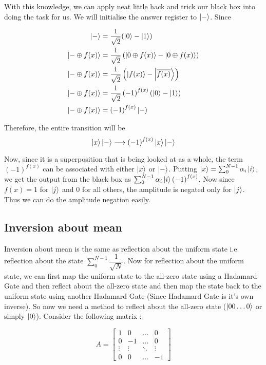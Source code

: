 \documentclass[a4paper]{article}
\begin{document}
With this knowledge, we can apply neat little hack and trick our black box into doing the task for us. We will initialise the answer register to $\ket{-}$. Since

\begin{align*}
\ket{-} &= \dfrac{1}{\sqrt{2}} ( \ket{0} - \ket{1} )\\
\ket{- \oplus {f(x)}} &= \dfrac{1}{\sqrt{2}} \left( \ket{0 \oplus {f(x)}} - \ket{0 \oplus {f(x)}} \right)\\
\ket{- \oplus {f(x)}} &= \dfrac{1}{\sqrt{2}} \left( \ket{{f(x)}} - \ket{\overline{f(x)}} \right)\\
\ket{- \oplus {f(x)}} &= \dfrac{1}{\sqrt{2}} \left( -1 \right) ^ {f(x)} \left( \ket{0} - \ket{1} \right)\\
\ket{- \oplus {f(x)}} &= \left( -1 \right) ^ {f(x)} \ket{-}\\
\end{align*}

Therefore, the entire transition will be
$$\ket{x}\ket{-} \longrightarrow \left( -1 \right) ^ {f(x)} \ket{x} \ket{-}$$

Now, since it is a superposition that is being looked at as a whole, the term $\left( -1 \right) ^ {f(x)}$ can be associated with either $\ket{x}$ or $\ket{-}$.
Putting $\ket{x}  = \sum_0^{N-1}\alpha_i\ket{i}$, we get the output from the black box as $\sum_0^{N-1}\alpha_i\ket{i} \left( -1 \right) ^ {f(x)}$. Now since $f(x) = 1$ for $\ket{j}$ and $0$ for all others, the amplitude is negated only for $\ket{j}$. Thus we can do the amplitude negation easily.
\subsection{Inversion about mean}
Inversion about mean is the same as reflection about the uniform state i.e. reflection about the state $\sum_0 ^{N - 1} \dfrac{1}{\sqrt{N}}$. Now for reflection about the uniform state, we can first map the uniform state to the all-zero state using a Hadamard Gate and then reflect about the all-zero state and then map the state back to the uniform state using another Hadamard Gate (Since Hadamard Gate is it's own inverse). So now we need a method to reflect about the all-zero state ($\ket{00\dots0}$ or simply $\ket{0}$). Consider the following matrix :-

\[
A = \begin{bmatrix}
    1       & 0      & \dots & 0 \\
    0       & -1     & \dots & 0 \\
    \vdots  & \vdots & \ddots & \vdots \\
    0       & 0      & \dots  & -1
    \end{bmatrix}
\]
\end{document}
